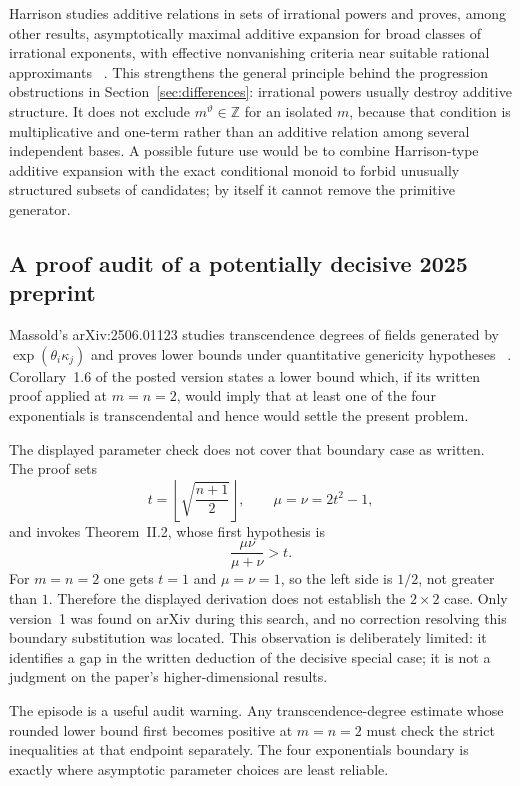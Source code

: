 \documentclass[11pt,oneside]{article}
\theoremstyle{definition}
\theoremstyle{remark}
\newcommand{\Z}{\mathbb Z}
\newcommand{\thetaq}{\vartheta}
\begin{document}
Harrison studies additive relations in sets of irrational powers and proves, among other
results, asymptotically maximal additive expansion for broad classes of irrational exponents,
with effective nonvanishing criteria near suitable rational approximants
~\cite{Harrison2026}.  This strengthens the general principle behind the progression
obstructions in Section~\ref{sec:differences}: irrational powers usually destroy additive
structure.  It does not exclude $m^{\thetaq}\in\Z$ for an isolated $m$, because that condition
is multiplicative and one-term rather than an additive relation among several independent
bases.  A possible future use would be to combine Harrison-type additive expansion with the
exact conditional monoid to forbid unusually structured subsets of candidates; by itself it
cannot remove the primitive generator.

\subsection{A proof audit of a potentially decisive 2025 preprint}

Massold's arXiv:2506.01123 studies transcendence degrees of fields generated by
$\exp(\theta_i\kappa_j)$ and proves lower bounds under quantitative genericity hypotheses
~\cite{Massold2025}.  Corollary~1.6 of the posted version states a lower bound which, if its
written proof applied at $m=n=2$, would imply that at least one of the four exponentials is
transcendental and hence would settle the present problem.

The displayed parameter check does not cover that boundary case as written.  The proof sets
\[
 t=\left\lfloor\sqrt{\frac{n+1}{2}}\right\rfloor,
 \qquad
 \mu=\nu=2t^2-1,
\]
and invokes Theorem~II.2, whose first hypothesis is
\[
 \frac{\mu\nu}{\mu+\nu}>t.
\]
For $m=n=2$ one gets $t=1$ and $\mu=\nu=1$, so the left side is $1/2$, not greater than
$1$.  Therefore the displayed derivation does not establish the $2\times2$ case.  Only
version~1 was found on arXiv during this search, and no correction resolving this boundary
substitution was located.  This observation is deliberately limited: it identifies a gap in
the written deduction of the decisive special case; it is not a judgment on the paper's
higher-dimensional results.

The episode is a useful audit warning.  Any transcendence-degree estimate whose rounded lower
bound first becomes positive at $m=n=2$ must check the strict inequalities at that endpoint
separately.  The four exponentials boundary is exactly where asymptotic parameter choices are
least reliable.
\end{document}
